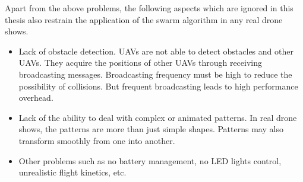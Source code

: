Apart from the above problems,
the following aspects which are ignored in this thesis
also restrain the application of the swarm algorithm in any real drone shows.
\begin{itemize}
    \item Lack of obstacle detection.
          UAVs are not able to detect obstacles and other UAVs.
          They acquire the positions of other UAVs through receiving broadcasting messages.
          Broadcasting frequency must be high to reduce the possibility of collisions.
          But frequent broadcasting leads to high performance overhead.
    \item Lack of the ability to deal with complex or animated patterns.
          In real drone shows, the patterns are more than just simple shapes.
          Patterns may also transform smoothly from one into another.
    \item Other problems such as no battery management, no LED lights control,
          unrealistic flight kinetics, etc.
\end{itemize}